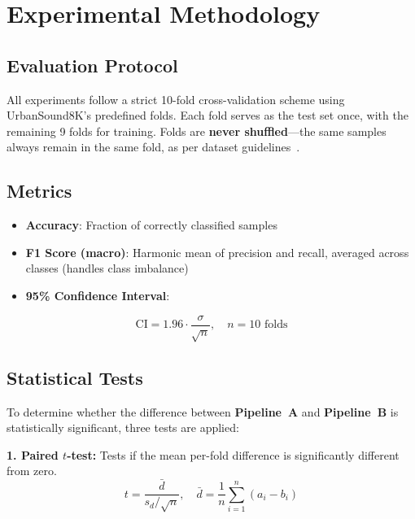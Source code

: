 \documentclass[conference]{IEEEtran}
\newcommand{\pipeA}{\textbf{Pipeline~A}}
\newcommand{\pipeB}{\textbf{Pipeline~B}}
\newcommand{\US}{UrbanSound8K}
\begin{document}
\section{Experimental Methodology}
\label{sec:methodology}

\subsection{Evaluation Protocol}

All experiments follow a strict 10-fold cross-validation scheme using \US{}'s predefined folds. Each fold serves as the test set once, with the remaining 9 folds for training. Folds are \textbf{never shuffled}---the same samples always remain in the same fold, as per dataset guidelines~\cite{salamon2014}.

\subsection{Metrics}

\begin{itemize}
    \item \textbf{Accuracy}: Fraction of correctly classified samples
    \item \textbf{F1 Score (macro)}: Harmonic mean of precision and recall, averaged across classes (handles class imbalance)
    \item \textbf{95\% Confidence Interval}:
\end{itemize}
\begin{equation}
    \text{CI} = 1.96 \cdot \frac{\sigma}{\sqrt{n}}, \quad n = 10 \text{ folds}
    \label{eq:ci}
\end{equation}

\subsection{Statistical Tests}

To determine whether the difference between \pipeA{} and \pipeB{} is statistically significant, three tests are applied:

\textbf{1. Paired $t$-test:} Tests if the mean per-fold difference is significantly different from zero.
\begin{equation}
    t = \frac{\bar{d}}{s_d / \sqrt{n}}, \quad \bar{d} = \frac{1}{n}\sum_{i=1}^{n}(a_i - b_i)
    \label{eq:ttest}
\end{equation}
\end{document}
